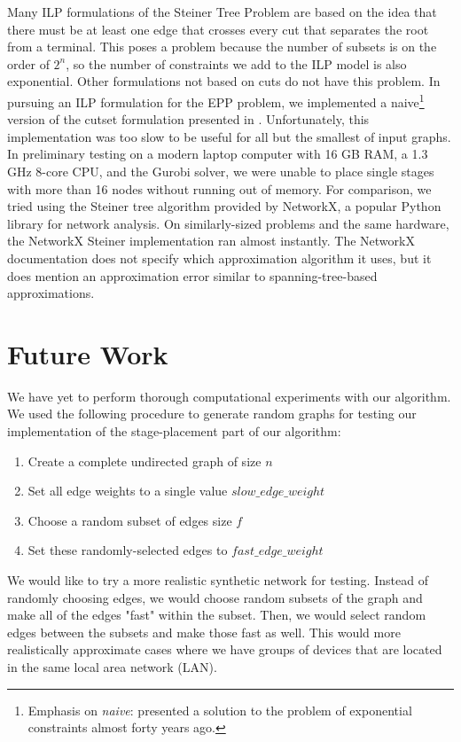 \documentclass{acmart}
\begin{document}
 	Many ILP formulations of the Steiner Tree Problem are based on the idea that there must be at least one edge that crosses every cut that separates the root from a terminal. This poses a problem because the number of subsets is on the order of $2^n$, so the number of constraints we add to the ILP model is also exponential. Other formulations not based on cuts do not have this problem. In pursuing an ILP formulation for the EPP problem, we implemented a naive\footnote{Emphasis on \textit{naive}: \cite{Aneja1980AnIL} presented a solution to the problem of exponential constraints almost forty years ago.}  version of the cutset formulation presented in \cite{Koch1998SolvingST}. Unfortunately, this implementation was too slow to be useful for all but the smallest of input graphs. In preliminary testing on a modern laptop computer with 16 GB RAM, a 1.3 GHz 8-core CPU, and the Gurobi solver, we were unable to place single stages with more than 16 nodes without running out of memory. For comparison, we tried using the Steiner tree algorithm provided by NetworkX, a popular Python library for network analysis\cite{networkx}. On similarly-sized problems and the same hardware, the NetworkX Steiner implementation ran almost instantly. The NetworkX documentation does not specify which approximation algorithm it uses, but it does mention an approximation error similar to spanning-tree-based approximations.
 	
 	\section{Future Work}
 	We have yet to perform thorough computational experiments with our algorithm. We used the following procedure to generate random graphs for testing our implementation of the stage-placement part of our algorithm:
 	\begin{enumerate}
 		\item Create a complete undirected graph of size $n$
 		\item Set all edge weights to a single value $slow\_edge\_weight$
 		\item Choose a random subset of edges size $f$
 		\item Set these randomly-selected edges to $fast\_edge\_weight$
 	\end{enumerate}
 	
 	We would like to try a more realistic synthetic network for testing. Instead of randomly choosing edges, we would choose random subsets of the graph and make all of the edges "fast" within the subset. Then, we would select random edges between the subsets and make those fast as well. This would more realistically approximate cases where we have groups of devices that are located in the same local area network (LAN).
 	
\end{document}
